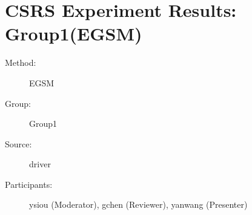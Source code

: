 \chapter {CSRS Experiment Results: Group1(EGSM)}
\small

\begin{description}
\item [Method:] EGSM
\item [Group:] Group1
\item [Source:] driver
\item [Participants:] ysiou (Moderator), gchen (Reviewer), yanwang (Presenter)
\end{description}
